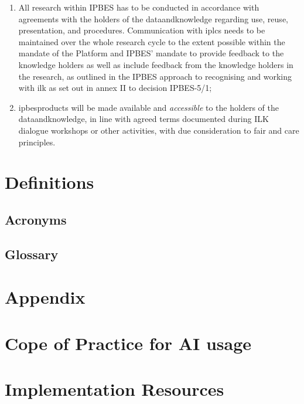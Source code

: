 \documentclass{article}
\begin{document}
\begin{enumerate}[label=(\alph*)]
    \item All \gls{research} within IPBES has to be conducted in accordance with agreements with the holders of the \gls{dataandknowledge} regarding use, reuse, presentation, and procedures. Communication with \glspl{iplc} needs to be maintained over the whole \gls{research} cycle to the extent possible within the mandate of the Platform and IPBES’ mandate to provide feedback to the \gls{knowledge} holders as well as include feedback from the \gls{knowledge} holders in the \gls{research}, as outlined in the IPBES approach to recognising and working with \gls{ilk} as set out in annex II to decision IPBES-5/1;

    \item \glspl{ipbesproduct} will be made available and \textit{accessible} to the holders of the \gls{dataandknowledge}, in line with agreed terms documented during ILK dialogue workshops or other activities, with due consideration to \gls{fair} and \gls{care} principles.
\end{enumerate}



\section{Definitions}
\subsection{Acronyms}

\printglossary[type=\acronymtype]

\subsection{Glossary}

\printglossary

\appendix
\section*{Appendix}

\section{Cope of Practice for AI usage}

\section{Implementation Resources}
\end{document}
